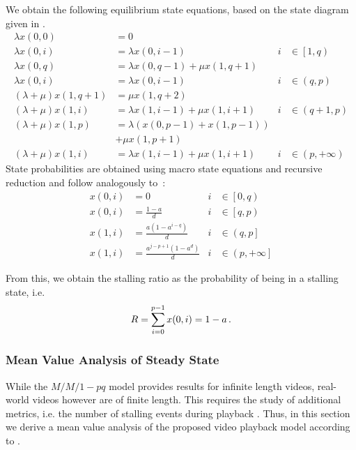 We obtain the following equilibrium state equations, based on the state diagram given in .
\begin{align*}
  \lambda x(0, 0) &= 0 & &\\
  \lambda x(0, i) &= \lambda x(0, i-1) & i&\in \left[1, q\right)\\
  \lambda x(0, q) &= \lambda x(0, q-1) + \mu x(1, q+1) & &\\
  \lambda x(0, i) &= \lambda x(0, i-1) & i&\in\left(q, p\right)\\
  (\lambda + \mu) x(1, q+1) &= \mu x(1, q+2) & &\\
  (\lambda + \mu) x(1, i) &= \lambda x(1, i-1) + \mu x(1, i+1) & i&\in\left(q+1, p\right)\\
  (\lambda + \mu) x(1, p) &= \lambda (x(0,p-1) + x(1, p-1)) & &\\
  & + \mu x(1, p+1) & &\\
  (\lambda + \mu) x(1, i) &= \lambda x(1, i-1) + \mu x(1, i+1) & i&\in\left(p, +\infty\right)
\end{align*}
State probabilities are obtained using macro state equations and recursive reduction and follow analogously to~\cite{Zhang2004}:
\begin{align*}
x(0, i) &= 0 & i&\in \left[0,q\right)\\ 
x(0, i) &= \frac{1-a}{d} &i&\in \left[q,p\right)\\
x(1, i) &= \frac{a(1- a^{i-q})}{d} &i&\in \left(q,p\right]\\
x(1, i) &= \frac{a^{j-p+1}(1-a^{d})}{d} &i&\in \left(p,+\infty\right]
\end{align*}

From this, we obtain the stalling ratio \stallingRatio as the probability of being in a stalling state, i.e.
\begin{equation}
R = \sum_{i=0}^{p-1} x(0, i) = 1-a \, .
\label{eq:application:qoe_user_behaviour:system_model:mm1pq:stalling_ratio_queuing}
\end{equation}

\subsubsection*{Mean Value Analysis of Steady State}\label{sec:application:qoe_user_behaviour:system_model:steady_state}
While the \(M/M/1-pq\) model provides results for infinite length videos, real-world videos however are of finite length.
This requires the study of additional metrics, i.e. the number of stalling events during playback \numberStallingEvents.
Thus, in this section we derive a mean value analysis of the proposed video playback model according to .

